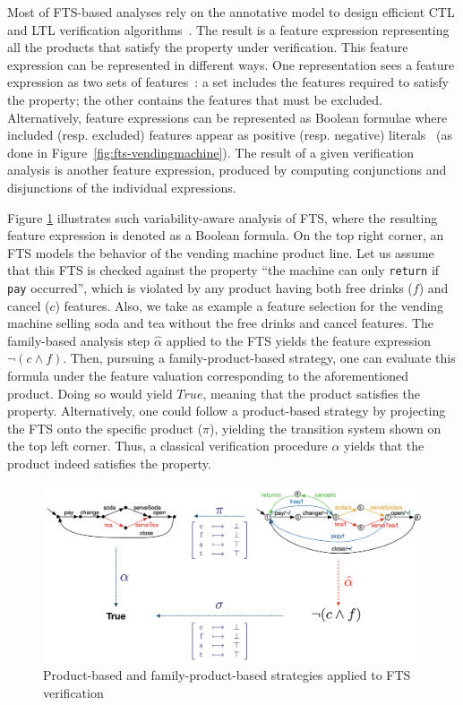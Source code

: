 Most of FTS-based analyses rely on the annotative model to design efficient CTL and LTL verification algorithms~\cite{Classen2013,Classen2014,Cordy2014}. The result %
is a feature expression representing all the products that satisfy the property under verification. This feature expression can be represented in different ways. One representation sees a feature expression as two sets of features~\cite{Classen2010}: a set includes the features required to satisfy the property; the other contains the features that must be excluded. Alternatively, feature expressions can be represented as Boolean formulae where included (resp. excluded) features appear as positive (resp. negative) literals~\cite{Classen2013} (as done in Figure~\ref{fig:fts-vendingmachine}). The result of a given verification analysis is another feature expression, produced by computing conjunctions and disjunctions of the individual expressions.

Figure \ref{fig:fts-strategies} illustrates such variability-aware analysis of FTS, where the resulting feature expression is denoted as a Boolean formula.
On the top right corner, an FTS models the behavior of the vending machine product line.
Let us assume that this FTS is checked against the property ``the machine can only \texttt{return} if \texttt{pay} occurred'', which is violated by any product having both free drinks ($f$) and cancel ($c$) features.
Also, we take as example a feature selection for the vending machine selling soda and tea without the free drinks and cancel features.
The family-based analysis step $\hat{\alpha}$ applied to the FTS yields the feature expression $\lnot (c \land f)$. Then, pursuing a family-product-based strategy, one can evaluate this formula under the feature valuation corresponding to the aforementioned product. Doing so would yield $True$, meaning that the product satisfies the property.
Alternatively, one could follow a product-based strategy by projecting the FTS onto the specific product ($\pi$), yielding the transition system shown on the top left corner.
Thus, a classical verification procedure $\alpha$ yields that the product indeed satisfies the property.

\begin{figure}[t]
	\centering
    \includegraphics[width = 0.9\linewidth]{figures/fts-strategies.png}
	\caption{Product-based and family-product-based strategies applied to FTS verification}
	\label{fig:fts-strategies}
\end{figure}


